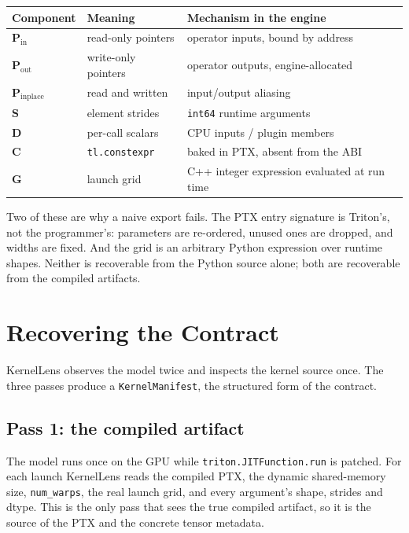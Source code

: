 \documentclass[11pt,a4paper]{article}
\begin{document}
\begin{center}
\small
\begin{tabularx}{\textwidth}{l l X}
\toprule
\textbf{Component} & \textbf{Meaning} & \textbf{Mechanism in the engine} \\ \midrule
$\mathbf{P}_{\text{in}}$ & read-only pointers & operator inputs, bound by address \\
$\mathbf{P}_{\text{out}}$ & write-only pointers & operator outputs, engine-allocated \\
$\mathbf{P}_{\text{inplace}}$ & read and written & input/output aliasing \\
$\mathbf{S}$ & element strides & \texttt{int64} runtime arguments \\
$\mathbf{D}$ & per-call scalars & CPU inputs / plugin members \\
$\mathbf{C}$ & \texttt{tl.constexpr} & baked in PTX, absent from the ABI \\
$\mathbf{G}$ & launch grid & C++ integer expression evaluated at run time \\
\bottomrule
\end{tabularx}
\label{tab:contract}
\end{center}

Two of these are why a naive export fails. The PTX entry signature is Triton's,
not the programmer's: parameters are re-ordered, unused ones are dropped, and
widths are fixed. And the grid is an arbitrary Python expression over runtime
shapes. Neither is recoverable from the Python source alone; both are recoverable
from the compiled artifacts.

\section{Recovering the Contract}
\label{sec:recover}

KernelLens observes the model twice and inspects the kernel source once. The
three passes produce a \texttt{KernelManifest}, the structured form of the
contract.

\subsection{Pass 1: the compiled artifact}

The model runs once on the GPU while \texttt{triton.JITFunction.run} is patched.
For each launch KernelLens reads the compiled PTX, the dynamic shared-memory
size, \texttt{num\_warps}, the real launch grid, and every argument's shape,
strides and dtype. This is the only pass that sees the true compiled artifact, so
it is the source of the PTX and the concrete tensor metadata.
\end{document}
